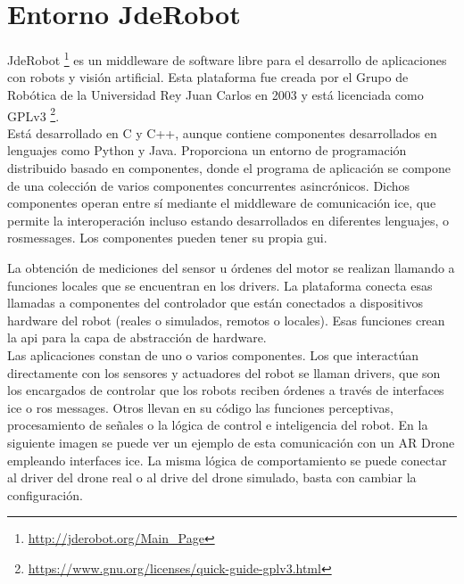 \section{Entorno JdeRobot}

JdeRobot \footnote{\url{http://jderobot.org/Main_Page}} es un middleware de software libre para el desarrollo de aplicaciones con robots y visión artificial. Esta plataforma fue creada por el Grupo de Robótica de la Universidad Rey Juan Carlos en 2003 y está licenciada como GPLv3 \footnote{\url{https://www.gnu.org/licenses/quick-guide-gplv3.html}}.\\

Está desarrollado en C y C++, aunque contiene componentes desarrollados en lenguajes como Python y Java. Proporciona un entorno de programación distribuido basado en componentes, donde el programa de aplicación se compone de una colección de varios componentes concurrentes asincrónicos. Dichos componentes operan entre sí mediante el middleware de comunicación \acrshort{ice}, que permite la interoperación incluso estando desarrollados en diferentes lenguajes, o \acrshort{ros}messages. Los componentes pueden tener su propia \acrfull{gui}.

La obtención de mediciones del sensor u órdenes del motor se realizan llamando a funciones locales que se encuentran en los drivers. La plataforma conecta esas llamadas a componentes del controlador que están conectados a dispositivos hardware del robot (reales o simulados, remotos o locales). Esas funciones crean la \acrfull{api} para la capa de abstracción de hardware. \\

Las aplicaciones constan de uno o varios componentes. Los que interactúan directamente con los sensores y actuadores del robot se llaman drivers, que son los encargados de controlar que los robots reciben órdenes a través de interfaces \acrshort{ice} o \acrshort{ros} messages. Otros llevan en su código las funciones perceptivas, procesamiento de señales o la lógica de control e inteligencia del robot. En la siguiente imagen se puede ver un ejemplo de esta comunicación con un AR Drone empleando interfaces \acrshort{ice}. La misma lógica de comportamiento se puede conectar al driver del drone real o al drive del drone simulado, basta con cambiar la configuración.

